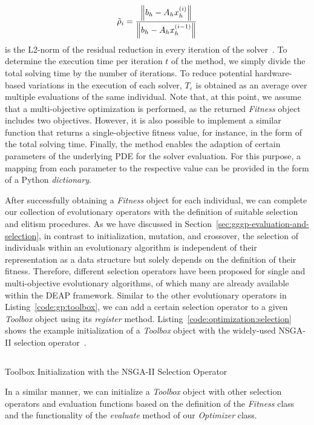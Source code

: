 \begin{equation}
	\tilde{\rho}_{i} = \frac{\norm{b_h - A_h x_{h}^{(i)} }}{\norm{b_h - A_h x^{(i-1)}_{h}}}
\end{equation}
is the L2-norm of the residual reduction in every iteration of the solver~\cite{trottenberg2000multigrid}.
To determine the execution time per iteration $t$ of the method, we simply divide the total solving time by the number of iterations.
To reduce potential hardware-based variations in the execution of each solver, $T_\varepsilon$ is obtained as an average over multiple evaluations of the same individual.
Note that, at this point, we assume that a multi-objective optimization is performed, as the returned \emph{Fitness} object includes two objectives.
However, it is also possible to implement a similar function that returns a single-objective fitness value, for instance, in the form of the total solving time.
Finally, the method enables the adaption of certain parameters of the underlying PDE for the solver evaluation.
For this purpose, a mapping from each parameter to the respective value can be provided in the form of a Python \emph{dictionary}.

After successfully obtaining a \emph{Fitness} object for each individual, we can complete our collection of evolutionary operators with the definition of suitable selection and elitism procedures.
As we have discussed in Section~\ref{sec:gggp-evaluation-and-selection}, in contrast to initialization, mutation, and crossover, the selection of individuals within an evolutionary algorithm is independent of their representation as a data structure but solely depends on the definition of their fitness.
Therefore, different selection operators have been proposed for single and multi-objective evolutionary algorithms, of which many are already available within the DEAP framework.  
Similar to the other evolutionary operators in Listing~\ref{code:gp:toolbox}, we can add a certain selection operator to a given \emph{Toolbox} object using its \emph{register} method.
Listing~\ref{code:optimization:selection} shows the example initialization of a \emph{Toolbox} object with the widely-used NSGA-II selection operator~\cite{deb2002fast}. 
\begin{listing}
	\inputminted{python}{evostencils/optimization/selection.py}
	\caption{Toolbox Initialization with the NSGA-II Selection Operator}
	\label{code:optimization:selection}
\end{listing}
In a similar manner, we can initialize a \emph{Toolbox} object with other selection operators and evaluation functions based on the definition of the \emph{Fitness} class and the functionality of the \emph{evaluate} method of our \emph{Optimizer} class.

